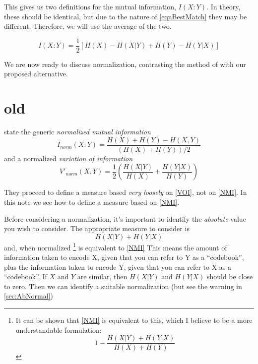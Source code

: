 \documentclass[9pt,technote]{IEEEtran}
\begin{document}
This gives us two definitions for the mutual information, $I(X:Y)$.
In theory, these should be identical, but due to the nature of \cref{eqnBestMatch}
they may be different. Therefore, we will use the average of the two.

\begin{equation}
	I(X:Y) = \frac12 \left[ H(X)-H(X|Y) + H(Y)-H(Y|X) \right]
\end{equation}

We are now ready to discuss normalization, contrasting the method of \lfk
with our proposed alternative.
\section{old}

\citet{lancichinetti-2009} state the generic \emph{normalized mutual information}
\begin{equation}
	I_{norm}(X:Y) = \frac { H(X) + H(Y) - H(X,Y) } { \left( H(X) + H(Y) \right ) /2 }   \label{NMI}
\end{equation}
and a normalized \emph{variation of information} 
\begin{equation}
	V'_{norm}(X,Y) = \frac12 \left(  \frac{ H(X|Y) }{ H(X) } + \frac{ H(Y|X) }{ H(Y) } \right)   \label{VOI}
\end{equation}

They proceed to define a measure based \emph{very loosely} on \cref{VOI}, not on \cref{NMI}. In this note we see how to define a measure
based on \cref{NMI}.

Before considering a normalization, it's important to identify the \emph{absolute} value you wish to consider.
The appropriate measure to consider is
\begin{equation}
	H(X|Y) + H(Y|X)   \label{CorrectMI}
\end{equation}
and, when normalized \footnote{
	It can be shown that \cref{NMI} is equivalent to this, which I believe to be a more understandable formulation:
 \[
	1 - \frac { H(X|Y) + H(Y|X)  }{ H(X) + H(Y) } 
	\]
} is equivalent to \cref{NMI}
This means the amount of information taken to encode X, given that you can refer to Y as a ``codebook'', plus
the information taken to encode Y, given that you can refer to X as a ``codebook''. If $X$ and $Y$ are similar, then
$H(X|Y)$ and $H(Y|X)$ should be close to zero. Then we can identify a suitable normalization (but see the warning in \cref{sec:AbNormal})

\begin{comment}
\section{WARNING}
I'm pretty sloppy, as ever, with my terminology. I just take $H(x)$ to mean the number of bits taken to encode $x$. Hence
I tend to think in $\log_2$, the log to the base 2, when technically I suppose it should be $\log_e$. There's lots of other careless things too, no doubt \begin{turn}{90}(-:\end{turn}.
\end{comment}
\end{document}
